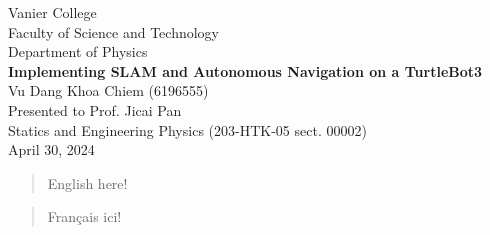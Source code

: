 \thispagestyle{empty}

\begin{spacing}{1.5}
    \centering
    \large Vanier College\\
    \large Faculty of Science and Technology\\
    \large Department of Physics\\
    \vspace{1cm}
    \Large\textbf{Implementing SLAM and Autonomous Navigation on a TurtleBot3}\\
    \vspace{1cm}
    \large Vu Dang Khoa Chiem (6196555)\\
    \vspace{1cm}
    \large Presented to Prof. Jicai Pan\\
    \large Statics and Engineering Physics (203-HTK-05 sect. 00002)\\
    \large April 30, 2024
\end{spacing}

\begin{abstract}
    English here!
\end{abstract}

\renewcommand{\abstractname}{Résumé}
\begin{abstract}
    Français ici!
\end{abstract}
